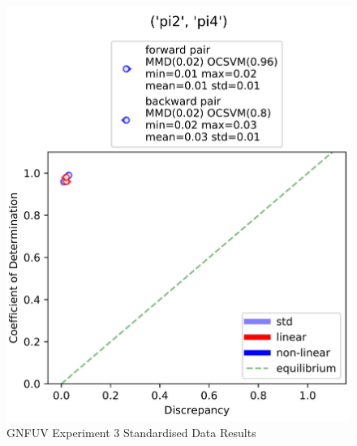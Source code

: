 \documentclass{mpaper}
\begin{document}
\begin{figure}
    \centering
    \includegraphics[scale = 0.09]{experiment_3_std.jpg}
    \caption{GNFUV Experiment 3 Standardised Data Results}
    \label{fig:gnfuv_exp3_std}
\end{figure}
\end{document}
